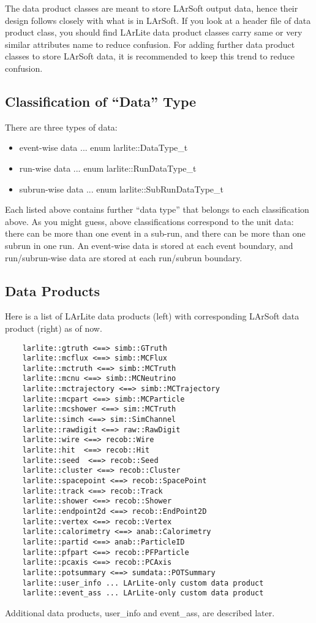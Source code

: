 The data product classes are meant to store LArSoft output data, hence their design follows closely with what is in LArSoft.
If you look at a header file of data product class, you should find LArLite data product classes carry same or very similar attributes name to reduce confusion.
For adding further data product classes to store LArSoft data, it is recommended to keep this trend to reduce confusion.

\subsection{Classification of ``Data'' Type}
There are three types of data:
\begin{itemize}
\item event-wise data ... {\ttfamily enum larlite::DataType\_t}
\item run-wise data ... {\ttfamily enum larlite::RunDataType\_t}
\item subrun-wise data ... {\ttfamily enum larlite::SubRunDataType\_t}
\end{itemize}
Each \enum listed above contains further ``data type'' that belongs to each classification above.
As you might guess, above classifications correspond to the unit data:
there can be more than one event in a sub-run, and there can be more than one subrun in one run.
An event-wise data is stored at each event boundary, and run/subrun-wise data are stored at
each run/subrun boundary.

\subsection{Data Products}

Here is a list of LArLite data products (left) with corresponding LArSoft data product (right) as of now.
\begin{lstlisting}
    larlite::gtruth <==> simb::GTruth
    larlite::mcflux <==> simb::MCFlux
    larlite::mctruth <==> simb::MCTruth
    larlite::mcnu <==> simb::MCNeutrino
    larlite::mctrajectory <==> simb::MCTrajectory
    larlite::mcpart <==> simb::MCParticle
    larlite::mcshower <==> sim::MCTruth
    larlite::simch <==> sim::SimChannel
    larlite::rawdigit <==> raw::RawDigit
    larlite::wire <==> recob::Wire
    larlite::hit  <==> recob::Hit
    larlite::seed  <==> recob::Seed
    larlite::cluster <==> recob::Cluster
    larlite::spacepoint <==> recob::SpacePoint
    larlite::track <==> recob::Track
    larlite::shower <==> recob::Shower
    larlite::endpoint2d <==> recob::EndPoint2D
    larlite::vertex <==> recob::Vertex
    larlite::calorimetry <==> anab::Calorimetry
    larlite::partid <==> anab::ParticleID
    larlite::pfpart <==> recob::PFParticle
    larlite::pcaxis <==> recob::PCAxis
    larlite::potsummary <==> sumdata::POTSummary
    larlite::user_info ... LArLite-only custom data product
    larlite::event_ass ... LArLite-only custom data product
\end{lstlisting}
Additional data products, {\ttfamily user\_info} and {\ttfamily event\_ass}, are described later.

